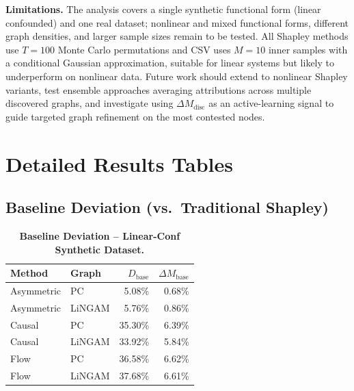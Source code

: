 \documentclass[12pt,letterpaper,twocolumn]{article}
\begin{document}
\noindent\textbf{Limitations.} The analysis covers a single synthetic functional form
(linear confounded) and one real dataset; nonlinear and mixed functional forms, different
graph densities, and larger sample sizes remain to be tested. All Shapley methods use
$T = 100$ Monte Carlo permutations and CSV uses $M = 10$ inner samples with a conditional
Gaussian approximation, suitable for linear systems but likely to underperform on nonlinear
data. Future work should extend
to nonlinear Shapley variants, test ensemble approaches averaging attributions across
multiple discovered graphs, and investigate using $\Delta M_{\text{disc}}$ as an
active-learning signal to guide targeted graph refinement on the most contested nodes.

\newpage


\onecolumn
\appendix

\section{Detailed Results Tables}
\label{app:tables}

\subsection{Baseline Deviation (vs.\ Traditional Shapley)}

\begin{table}[H]
  \centering
  \caption{\textbf{Baseline Deviation -- Linear-Conf Synthetic Dataset.}}
  \label{tab:baseline_synth}
  \begin{tabular}{llrr}
    \toprule
    \textbf{Method} & \textbf{Graph} & $D_{\text{base}}$ & $\Delta M_{\text{base}}$ \\
    \midrule
    Asymmetric & PC     & 5.08\%  & 0.68\% \\
    Asymmetric & LiNGAM & 5.76\%  & 0.86\% \\
    Causal     & PC     & 35.30\% & 6.39\% \\
    Causal     & LiNGAM & 33.92\% & 5.84\% \\
    Flow       & PC     & 36.58\% & 6.62\% \\
    Flow       & LiNGAM & 37.68\% & 6.61\% \\
    \bottomrule
  \end{tabular}
\end{table}
\end{document}
